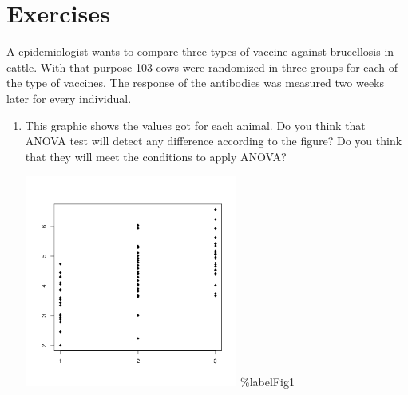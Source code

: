 \section{Exercises}
\label{ANOVAExercises}

\begin{problem}
  A epidemiologist wants to compare three types of vaccine against
  brucellosis in cattle. With that purpose 103 cows were randomized in
  three groups for each of the type of vaccines. The response of the
  antibodies was measured two weeks later for every individual. 
\begin{enumerate}
\item This graphic shows the values got for each animal. Do you
  think that ANOVA test will detect any difference according to the
  figure? Do you think that they will meet the conditions to apply
  ANOVA? 
\begin{center}
  \includegraphics[width=7cm]{./ch_07a_inference_for_means_oi_biostat/figures/eoce/tema7-5}
  \%label{Fig1}
\end{center}


\end{enumerate}
\end{problem}
